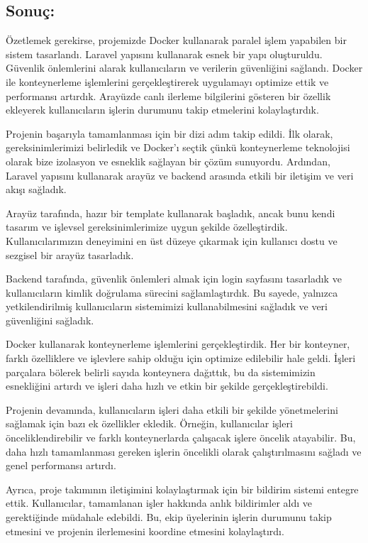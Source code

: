 \subsection{Sonuç:}
Özetlemek gerekirse, projemizde Docker kullanarak paralel işlem yapabilen bir sistem tasarlandı. Laravel yapısını kullanarak esnek bir yapı oluşturuldu. Güvenlik önlemlerini alarak kullanıcıların ve verilerin güvenliğini sağlandı. Docker ile konteynerleme işlemlerini gerçekleştirerek
uygulamayı optimize ettik ve performansı artırdık. Arayüzde canlı ilerleme bilgilerini gösteren bir özellik ekleyerek kullanıcıların işlerin durumunu takip etmelerini kolaylaştırdık.

Projenin başarıyla tamamlanması için bir dizi adım takip edildi. İlk olarak, gereksinimlerimizi belirledik ve Docker'ı seçtik çünkü konteynerleme teknolojisi olarak bize izolasyon ve esneklik sağlayan bir çözüm sunuyordu. Ardından, Laravel yapısını kullanarak arayüz ve backend arasında etkili bir iletişim ve veri akışı sağladık.

Arayüz tarafında, hazır bir template kullanarak başladık, ancak bunu kendi tasarım ve işlevsel gereksinimlerimize uygun şekilde özelleştirdik. Kullanıcılarımızın deneyimini en üst düzeye çıkarmak için kullanıcı dostu ve sezgisel bir arayüz tasarladık.

Backend tarafında, güvenlik önlemleri almak için login sayfasını tasarladık ve kullanıcıların kimlik doğrulama sürecini sağlamlaştırdık. Bu sayede, yalnızca yetkilendirilmiş kullanıcıların sistemimizi kullanabilmesini sağladık ve veri güvenliğini sağladık.

Docker kullanarak konteynerleme işlemlerini gerçekleştirdik. Her bir konteyner, farklı özelliklere ve işlevlere sahip olduğu için optimize edilebilir hale geldi. İşleri parçalara bölerek belirli sayıda konteynera dağıttık, bu da sistemimizin esnekliğini artırdı ve işleri daha hızlı ve etkin bir şekilde gerçekleştirebildi.

Projenin devamında, kullanıcıların işleri daha etkili bir şekilde yönetmelerini sağlamak için bazı ek özellikler ekledik. Örneğin, kullanıcılar işleri önceliklendirebilir ve farklı konteynerlarda çalışacak işlere öncelik atayabilir. Bu, daha hızlı tamamlanması gereken işlerin öncelikli olarak çalıştırılmasını sağladı ve genel performansı artırdı.

Ayrıca, proje takımının iletişimini kolaylaştırmak için bir bildirim sistemi entegre ettik. Kullanıcılar, tamamlanan işler hakkında anlık bildirimler aldı ve gerektiğinde müdahale edebildi. Bu, ekip üyelerinin işlerin durumunu takip etmesini ve projenin ilerlemesini koordine etmesini kolaylaştırdı.

